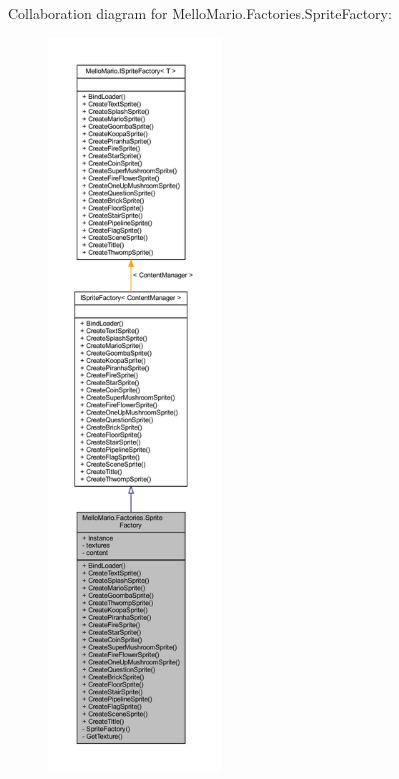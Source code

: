 Collaboration diagram for Mello\+Mario.\+Factories.\+Sprite\+Factory\+:
\nopagebreak
\begin{figure}[H]
\begin{center}
\leavevmode
\includegraphics[height=550pt]{classMelloMario_1_1Factories_1_1SpriteFactory__coll__graph}
\end{center}
\end{figure}
